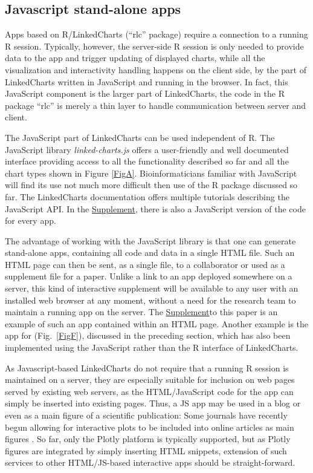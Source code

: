 \documentclass[twocolumn,10pt]{article}
\newcommand{\Supplement}{\href{https://anders-biostat.github.io/lc-paper/}{Supplement}}
\begin{document}
\subsection{Javascript stand-alone apps}

Apps based on R/LinkedCharts (``rlc'' package) require a connection to a running R session. Typically, however, the server-side R session is only needed to provide data to the app and trigger updating of displayed charts, while all the visualization and interactivity handling happens on the client side, by the part of LinkedCharts written in JavaScript and running in the browser. In fact, this JavaScript component is the larger part of LinkedCharts, the code in the R package ``rlc'' is merely a thin layer to handle communication between server and client.

The JavaScript part of LinkedCharts can be used independent of R. The JavaScript library \emph{linked-charts.js} offers a user-friendly and well documented interface providing access to all the functionality described so far and all the chart types shown in Figure \ref{FigA}. Bioinformaticians familiar with JavaScript will find its use not much more difficult then use of the R package discussed so far. The LinkedCharts documentation offers multiple tutorials  describing the JavaScript API. In the \Supplement, there is also a JavaScript version of the code for every app.

The advantage of working with the JavaScript library is that one can generate stand-alone apps, containing all code and data in a single HTML file. Such an HTML page can then be sent, as a single file, to a collaborator or used as a supplement file for a paper. Unlike a link to an app deployed somewhere on a server, this kind of interactive supplement will be available to any user with an installed web browser at any moment, without a need for the research team to maintain a running app on the server. The \Supplement to this paper is an example of such an app contained within an HTML page. Another example is the app for \citet{wang_2020} (Fig.\ \ref{FigF}), discussed in the preceding section, which has also been implemented using the JavaScript rather than the R interface of LinkedCharts. 

As Javascript-based LinkedCharts do not require that a running R session is maintained on a server, they are especially suitable for inclusion on web pages served by existing web servers, as the HTML/JavaScript code for the app can simply be inserted into existing pages. Thus, a JS app may be used in a blog or even as a main figure of a scientific publication: Some journals have recently begun allowing for interactive plots to be included into online articles as main figures \citep{ingraham_2017}. So far, only the Plotly platform is typically supported, but as Plotly figures are integrated by simply inserting HTML snippets, extension of such services to other HTML/JS-based interactive apps should be straight-forward.
\end{document}

